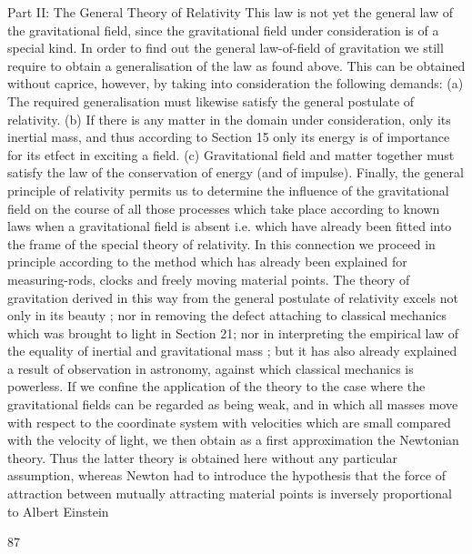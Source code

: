 \documentclass{article}
\begin{document}
Part II: The General Theory of Relativity
This law is not yet the general law of the gravitational field, since the gravitational field
under consideration is of a special kind. In order to find out the general law-of-field of
gravitation we still require to obtain a generalisation of the law as found above. This can be
obtained without caprice, however, by taking into consideration the following demands:
(a) The required generalisation must likewise satisfy the general
postulate of relativity.
(b) If there is any matter in the domain under consideration, only its
inertial mass, and thus according to Section 15 only its energy is
of importance for its etfect in exciting a field.
(c) Gravitational field and matter together must satisfy the law of the
conservation of energy (and of impulse).
Finally, the general principle of relativity permits us to determine the influence of the
gravitational field on the course of all those processes which take place according to known
laws when a gravitational field is absent i.e. which have already been fitted into the frame
of the special theory of relativity. In this connection we proceed in principle according to
the method which has already been explained for measuring-rods, clocks and freely moving
material points.
The theory of gravitation derived in this way from the general postulate of relativity
excels not only in its beauty ; nor in removing the defect attaching to classical mechanics
which was brought to light in Section 21; nor in interpreting the empirical law of the
equality of inertial and gravitational mass ; but it has also already explained a result of
observation in astronomy, against which classical mechanics is powerless.
If we confine the application of the theory to the case where the gravitational fields can
be regarded as being weak, and in which all masses move with respect to the coordinate
system with velocities which are small compared with the velocity of light, we then obtain
as a first approximation the Newtonian theory. Thus the latter theory is obtained here
without any particular assumption, whereas Newton had to introduce the hypothesis that the
force of attraction between mutually attracting material points is inversely proportional to
Albert Einstein

87
\end{document}
